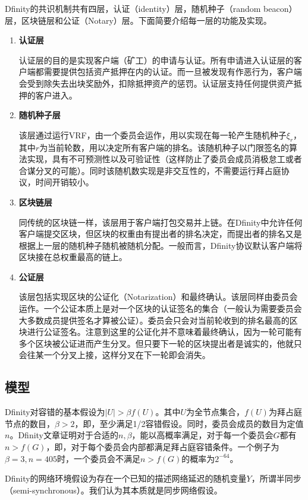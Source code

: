 Dfinity的共识机制共有四层，认证（identity）层，随机种子（random beacon）层，区块链层和公证（Notary）层。下面简要介绍每一层的功能及实现。
\begin{enumerate}
	\item \textbf{认证层}
	
	认证层的目的是实现客户端（矿工）的申请与认证。所有申请进入认证层的客户端都需要提供包括资产抵押在内的认证。而一旦被发现有作恶行为，客户端会受到除失去出块奖励外，扣除抵押资产的惩罚。认证层支持任何提供资产抵押的客户进入。
	
	\item \textbf{随机种子层}
	
	该层通过运行VRF，由一个委员会运作，用以实现在每一轮产生随机种子$\xi_r$，其中$r$为当前轮数，用以决定所有客户端的排名。该随机种子以门限签名的算法实现，具有不可预测性以及可验证性（这样防止了委员会成员消极怠工或者合谋分叉的可能）。同时该随机数实现是非交互性的，不需要运行拜占庭协议，时间开销较小。
	
	\item \textbf{区块链层}
	
	同传统的区块链一样，该层用于客户端打包交易并上链。在Dfinity中允许任何客户端提交区块，但区块的权重由有提出者的排名决定，而提出者的排名又是根据上一层的随机种子随机被随机分配。一般而言，Dfinity协议默认客户端将区块接在总权重最高的链上。
	
	\item \textbf{公证层}
	
	该层包括实现区块的公证化（Notarization）和最终确认。该层同样由委员会运作。一个公证本质上是对一个区块的认证签名的集合（一般认为需要委员会大多数成员提供签名才算被公证）。委员会只会对当前轮收到的排名最高的区块进行公证签名。注意到这里的公证化并不意味着最终确认，因为一轮可能有多个区块被公证进而产生分叉。但只要下一轮的区块提出者是诚实的，他就只会往某一个分叉上接，这样分叉在下一轮即会消失。
\end{enumerate}

\subsection{模型}
Dfinity对容错的基本假设为$|U|>\beta  f(U)$。其中$U$为全节点集合，$f(U)$为拜占庭节点的数目，$\beta>2$，即，至少满足1/2容错假设。同时，委员会成员的数目为定值$n$。Dfinity文章证明对于合适的$n,\beta$，能以高概率满足，对于每一个委员会$G$都有$n>f(G)$，即，对于每个委员会内部都满足拜占庭容错条件。一个例子为$\beta=3,n=405$时，一个委员会不满足$n>f(G)$的概率为$2^{-64}$。

Dfinity的网络环境假设为存在一个已知的描述网络延迟的随机变量$Y$，所谓半同步（semi-synchronous）。我们认为其本质就是同步网络假设。


